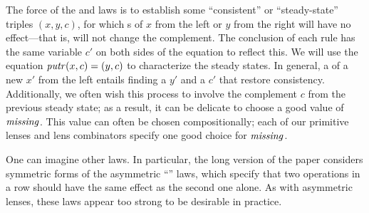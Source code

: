 \iftext The force of the  and  laws is to establish some
``consistent'' or ``steady-state'' triples $(x,y,c)$, for which \PUT{}s of $x$
from the left or $y$ from the right will have no effect---that is, will not
change the complement. The conclusion of each rule has the same variable
$c'$ on both sides of the equation to reflect this.  We will use the
equation $\mathit{putr}(x,c) = (y,c)$ to characterize the steady states.  In
general, a \PUT{} of a new $x'$ from the left entails finding a $y'$ and a
$c'$ that restore consistency.  Additionally, we often wish this
process to involve the
complement $c$ from the previous steady state; as a result, it can be
delicate to choose a good value of $\mathit{missing}$. This value can often be
chosen compositionally; each of our primitive lenses and lens combinators
specify one good choice for $\mathit{missing}$.

\iflater{}\fi \fi

\iffull\else One can imagine other laws.  In particular, the long version of
the paper considers symmetric forms of the asymmetric ``'' laws,
which specify that two \PUT{} operations in a row should have the same
effect as the second one alone.  As with asymmetric lenses, these
laws appear too strong to be desirable in practice.  \fi



